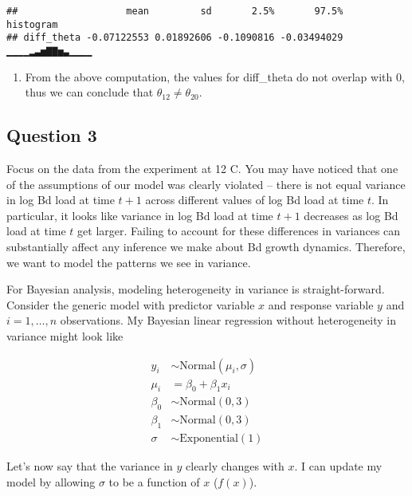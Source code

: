\documentclass[
]{article}
\providecommand{\tightlist}{%
  \setlength{\itemsep}{0pt}\setlength{\parskip}{0pt}}
\begin{document}
\begin{verbatim}
##                   mean         sd       2.5%       97.5%       histogram
## diff_theta -0.07122553 0.01892606 -0.1090816 -0.03494029 ▁▁▁▁▂▃▅▇▇▅▃▁▁▁▁
\end{verbatim}

\begin{enumerate}
\def\labelenumi{\alph{enumi}.}
\setcounter{enumi}{2}
\tightlist
\item
  From the above computation, the values for diff\_theta do not overlap
  with 0, thus we can conclude that \(\theta_{12} \neq \theta_{20}\).
\end{enumerate}

\subsection{Question 3}\label{question-3}

Focus on the data from the experiment at 12 C. You may have noticed that
one of the assumptions of our model was clearly violated -- there is not
equal variance in log Bd load at time \(t + 1\) across different values
of log Bd load at time \(t\). In particular, it looks like variance in
log Bd load at time \(t + 1\) decreases as log Bd load at time \(t\) get
larger. Failing to account for these differences in variances can
substantially affect any inference we make about Bd growth dynamics.
Therefore, we want to model the patterns we see in variance.

For Bayesian analysis, modeling heterogeneity in variance is
straight-forward. Consider the generic model with predictor variable
\(x\) and response variable \(y\) and \(i = 1, \dots, n\) observations.
My Bayesian linear regression without heterogeneity in variance might
look like

\[
\begin{aligned}
y_i &\sim \text{Normal}(\mu_i, \sigma) \\
\mu_i &= \beta_0 + \beta_1 x_i \\
\beta_0 &\sim \text{Normal}(0, 3) \\
\beta_1 &\sim \text{Normal}(0, 3) \\
\sigma &\sim \text{Exponential}(1)
\end{aligned}
\]

Let's now say that the variance in \(y\) clearly changes with \(x\). I
can update my model by allowing \(\sigma\) to be a function of \(x\)
(\(f(x)\)).
\end{document}
